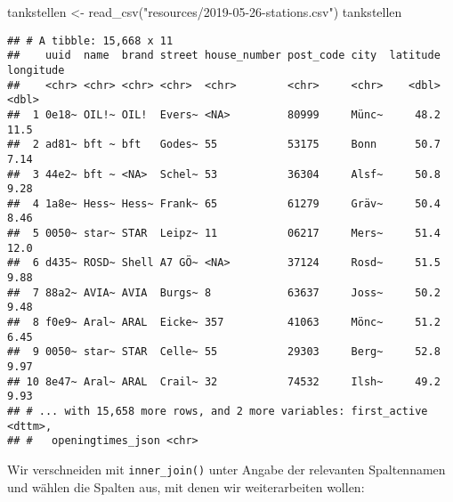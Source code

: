 \documentclass[
  ngerman,
]{article}
\newenvironment{Shaded}{\begin{snugshade}}{\end{snugshade}}
\newcommand{\FunctionTok}[1]{\textcolor[rgb]{0.00,0.00,0.00}{#1}}
\newcommand{\NormalTok}[1]{#1}
\newcommand{\OtherTok}[1]{\textcolor[rgb]{0.56,0.35,0.01}{#1}}
\newcommand{\StringTok}[1]{\textcolor[rgb]{0.31,0.60,0.02}{#1}}
\begin{document}
\begin{Shaded}
\begin{Highlighting}[]
\NormalTok{tankstellen }\OtherTok{\textless{}{-}} \FunctionTok{read\_csv}\NormalTok{(}\StringTok{"resources/2019{-}05{-}26{-}stations.csv"}\NormalTok{)}
\NormalTok{tankstellen}
\end{Highlighting}
\end{Shaded}

\begin{verbatim}
## # A tibble: 15,668 x 11
##    uuid  name  brand street house_number post_code city  latitude longitude
##    <chr> <chr> <chr> <chr>  <chr>        <chr>     <chr>    <dbl>     <dbl>
##  1 0e18~ OIL!~ OIL!  Evers~ <NA>         80999     Münc~     48.2     11.5 
##  2 ad81~ bft ~ bft   Godes~ 55           53175     Bonn      50.7      7.14
##  3 44e2~ bft ~ <NA>  Schel~ 53           36304     Alsf~     50.8      9.28
##  4 1a8e~ Hess~ Hess~ Frank~ 65           61279     Gräv~     50.4      8.46
##  5 0050~ star~ STAR  Leipz~ 11           06217     Mers~     51.4     12.0 
##  6 d435~ ROSD~ Shell A7 GÖ~ <NA>         37124     Rosd~     51.5      9.88
##  7 88a2~ AVIA~ AVIA  Burgs~ 8            63637     Joss~     50.2      9.48
##  8 f0e9~ Aral~ ARAL  Eicke~ 357          41063     Mönc~     51.2      6.45
##  9 0050~ star~ STAR  Celle~ 55           29303     Berg~     52.8      9.97
## 10 8e47~ Aral~ ARAL  Crail~ 32           74532     Ilsh~     49.2      9.93
## # ... with 15,658 more rows, and 2 more variables: first_active <dttm>,
## #   openingtimes_json <chr>
\end{verbatim}

Wir verschneiden mit \texttt{inner\_join()} unter Angabe der relevanten Spaltennamen und wählen die Spalten aus, mit denen wir weiterarbeiten wollen:
\end{document}
